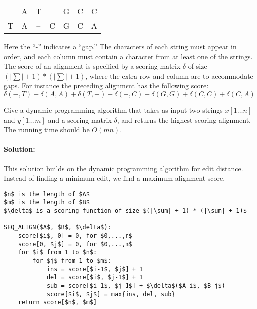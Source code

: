 \documentclass[12pt]{article}
\newcommand{\BigO}[1]{\ensuremath{O(#1)}}
\begin{document}
\begin{center}
\begin{tabular}{c c c c c c c}
-- &A &T &-- &G &C &C \\
T &A &-- &C &G &C &A
\end{tabular}
\end{center}

Here the ``-'' indicates a ``gap.'' The characters of each string must appear
in order, and each column must contain a character from at least one of 
the strings. The score of an alignment is specified by a scoring matrix
$\delta$
of size $(|\sum| + 1) * (|\sum| + 1)$, where the extra row and column are to
accommodate gaps. For instance the preceding alignment has the following score:
$$\delta(-, T ) + \delta(A, A) + \delta(T, -) + \delta(-, C) + \delta(G,
G) + \delta(C, C) + \delta(C, A)$$

Give a dynamic programming algorithm that takes as input two strings
$x[1 \dots n]$ and $y[1 \dots m]$ and a scoring matrix $\delta$, and returns
the highest-scoring alignment. The running time should be $\BigO{mn}$.

\paragraph{Solution:}
This solution builds on the dynamic programming algorithm for edit
distance. Instead of finding a minimum edit, we find a maximum
alignment score.
\begin{lstlisting}[mathescape]
$n$ is the length of $A$
$m$ is the length of $B$
$\delta$ is a scoring function of size $(|\sum| + 1) * (|\sum| + 1)$

SEQ_ALIGN($A$, $B$, $\delta$):
    score[$i$, 0] = 0, for $0,...,n$
    score[0, $j$] = 0, for $0,...,m$
    for $i$ from 1 to $n$:
        for $j$ from 1 to $m$:
            ins = score[$i-1$, $j$] + 1
            del = score[$i$, $j-1$] + 1
            sub = score[$i-1$, $j-1$] + $\delta$($A_i$, $B_j$)
            score[$i$, $j$] = max{ins, del, sub}
    return score[$n$, $m$]
\end{lstlisting}
\end{document}
